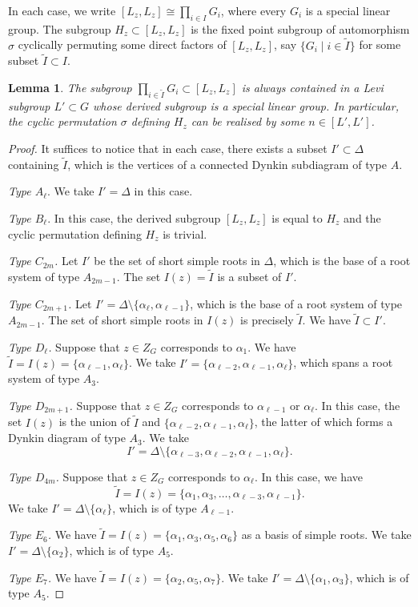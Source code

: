 \documentclass[11pt,oneside,dvipsnames]{amsart}
\theoremstyle{plain}
\newtheorem{Lem}[Thm]{Lemma}
\theoremstyle{definition}
\theoremstyle{named}
\begin{document}
In each case, we write $[L_z,L_z]\cong \prod_{i\in I}G_i$, where every $G_i$ is a special linear group. The subgroup $H_z\subset[L_z,L_z]$ is the fixed point subgroup of automorphism $\sigma$ cyclically permuting some direct factors of $[L_z,L_z]$, say $\{G_i\mid i\in \tilde{I}\}$ for some subset $\tilde{I}\subset I$. 
\begin{Lem}\label{Lem-L'-SL}
The subgroup $\prod_{i\in \tilde{I}}G_i\subset[L_z,L_z]$ is always contained in a Levi subgroup $L'\subset G$ whose derived subgroup is a special linear group. In particular, the cyclic permutation $\sigma$ defining $H_z$ can be realised by some $n\in[L',L']$. 
\end{Lem}
\begin{proof}
It suffices to notice that in each case, there exists a subset $I'\subset \Delta$ containing $\tilde{I}$, which is the vertices of a connected Dynkin subdiagram of type $A$.

\textit{Type $A_{\ell}$}. We take $I'=\Delta$ in this case.

\textit{Type $B_{\ell}$}. In this case, the derived subgroup $[L_z,L_z]$ is equal to $H_z$ and the cyclic permutation defining $H_z$ is trivial.

\textit{Type $C_{2m}$.} Let $I'$ be the set of short simple roots in $\Delta$, which is the base of a root system of type $A_{2m-1}$. The set $I(z)=\tilde{I}$ is a subset of $I'$. 

\textit{Type $C_{2m+1}$.} Let $I'=\Delta\setminus\{\alpha_{\ell},\alpha_{\ell-1}\}$, which is the base of a root system of type $A_{2m-1}$. The set of short simple roots in $I(z)$ is precisely $\tilde{I}$. We have $\tilde{I}\subset I'$. 

\textit{Type $D_{\ell}$.} Suppose that $z\in Z_G$ corresponds to $\alpha_1$. We have $\tilde{I}=I(z)=\{\alpha_{\ell-1},\alpha_{\ell}\}$. We take $I'=\{\alpha_{\ell-2},\alpha_{\ell-1},\alpha_{\ell}\}$, which spans a root system of type $A_3$.

\textit{Type $D_{2m+1}$.} Suppose that $z\in Z_G$ corresponds to $\alpha_{\ell-1}$ or $\alpha_{\ell}$. In this case, the set $I(z)$ is the union of $\tilde{I}$ and $\{\alpha_{\ell-2},\alpha_{\ell-1},\alpha_{\ell}\}$, the latter of which forms a Dynkin diagram of type $A_3$. We take 
$$
I'=\Delta\setminus\{\alpha_{\ell-3},\alpha_{\ell-2},\alpha_{\ell-1},\alpha_{\ell}\}.
$$

\textit{Type $D_{4m}$.} Suppose that $z\in Z_G$ corresponds to $\alpha_{\ell}$. In this case, we have 
$$
\tilde{I}=I(z)=\{\alpha_1,\alpha_3,\ldots,\alpha_{\ell-3},\alpha_{\ell-1}\}.
$$
We take $I'=\Delta\setminus\{\alpha_{\ell}\}$, which is of type $A_{\ell-1}$.

\textit{Type $E_6$.} We have $\tilde{I}=I(z)=\{\alpha_1,\alpha_3,\alpha_5,\alpha_6\}$ as a basis of simple roots. We take $I'=\Delta\setminus\{\alpha_2\}$, which is of type $A_5$.

\textit{Type $E_7$.} We have $\tilde{I}=I(z)=\{\alpha_2,\alpha_5,\alpha_7\}$. We take $I'=\Delta\setminus\{\alpha_1,\alpha_3\}$, which is of type $A_5$.
\end{proof}
\end{document}
